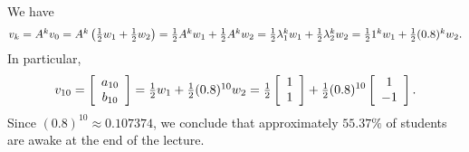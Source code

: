 \documentclass[a4paper]{amsart}
\renewenvironment{solution}{\SolutionInline}{\endSolutionInline}
\begin{document}
\begin{solution}
 We have
 $${\textstyle v_k = A^kv_0 =
    A^k\left(\tfrac{1}{2} w_1 + \tfrac{1}{2} w_2\right) =
    \tfrac{1}{2} A^kw_1 + \tfrac{1}{2} A^kw_2 =
    \tfrac{1}{2}\lambda_1^kw_1 + \tfrac{1}{2}\lambda_2^kw_2 =
    \tfrac{1}{2} 1^kw_1 + \tfrac{1}{2}(0.8)^kw_2}.
 $$ In particular,
 $$
  v_{10} = \left[\begin{array}{cc} a_{10}\\ b_{10} \end{array}\right] =
 {\textstyle \tfrac{1}{2} w_1 + \tfrac{1}{2}(0.8)^{10}w_2} =
 {\textstyle \tfrac{1}{2}}
    \left[\begin{array}{c} 1 \\ 1 \end{array}\right] +
 {\textstyle \tfrac{1}{2}}(0.8)^{10}
    \left[\begin{array}{c} 1 \\ -1 \end{array}\right].
 $$
 Since $(0.8)^{10} \approx 0.107374$, we conclude that
 approximately $55.37\%$ of students are awake at the end of the
 lecture.
\end{solution}
\end{document}
